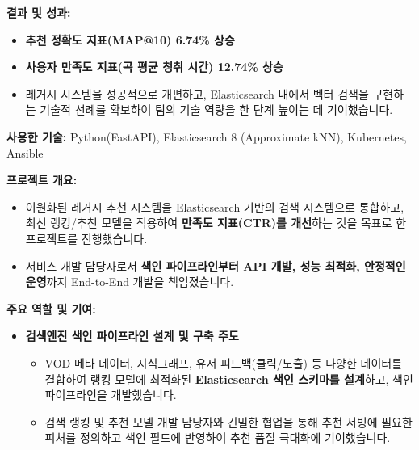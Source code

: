 \documentclass[letterpaper,11pt]{article}
\begin{document}
{{          %
          \textbf{결과 및 성과:}
          \begin{itemize}[leftmargin=*]
              \item \textbf{추천 정확도 지표(MAP@10) 6.74\% 상승}
              \item \textbf{사용자 만족도 지표(곡 평균 청취 시간) 12.74\% 상승}
              \item 레거시 시스템을 성공적으로 개편하고, Elasticsearch 내에서 벡터 검색을 구현하는 기술적 선례를 확보하여 팀의 기술 역량을 한 단계 높이는 데 기여했습니다.
          \end{itemize}

          \textbf{사용한 기술:} Python(FastAPI), Elasticsearch 8 (Approximate kNN), Kubernetes, Ansible
        }
      \resumeSubProjectListEnd

      \resumeSubProjectListStart

        {
          \textbf{프로젝트 개요:}
          \begin{itemize}[leftmargin=*]
              \item 이원화된 레거시 추천 시스템을 Elasticsearch 기반의 검색 시스템으로 통합하고, 최신 랭킹/추천 모델을 적용하여 \textbf{만족도 지표(CTR)를 개선}하는 것을 목표로 한 프로젝트를 진행했습니다.
              \item 서비스 개발 담당자로서 \textbf{색인 파이프라인부터 API 개발, 성능 최적화, 안정적인 운영}까지 End-to-End 개발을 책임졌습니다.
          \end{itemize}

          \textbf{주요 역할 및 기여:}
          \begin{itemize}[leftmargin=*]
              \item \textbf{검색엔진 색인 파이프라인 설계 및 구축 주도}
                  \begin{itemize}[leftmargin=*, label=$\circ$]
                      \item VOD 메타 데이터, 지식그래프, 유저 피드백(클릭/노출) 등 다양한 데이터를 결합하여 랭킹 모델에 최적화된 \textbf{Elasticsearch 색인 스키마를 설계}하고, 색인 파이프라인을 개발했습니다.
                      \item 검색 랭킹 및 추천 모델 개발 담당자와 긴밀한 협업을 통해 추천 서빙에 필요한 피처를 정의하고 색인 필드에 반영하여 추천 품질 극대화에 기여했습니다.
                  \end{itemize}


\end{itemize}}}
\end{document}
